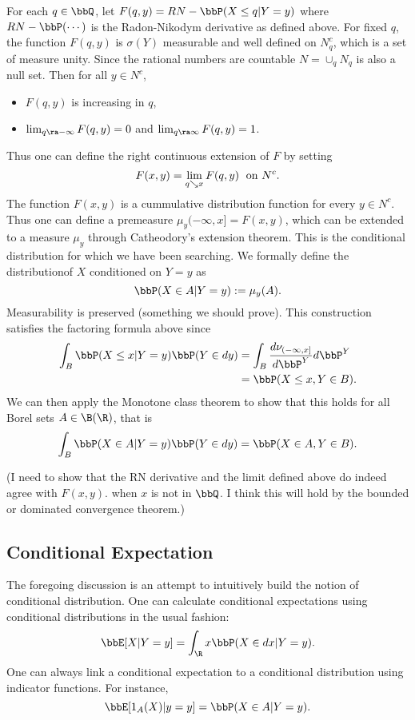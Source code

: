 \documentclass{report}
\begin{document}
For each $q \in \bbQ$, let $F(q,y) = RN-\bbP(X \leq q | Y = y)$ where $RN-\bbP(\cdots)$ is the Radon-Nikodym derivative as defined above.  For fixed $q$, the function $F(q,y)$ is $\sigma(Y)$ measurable and well defined on $N_q^c$, which is a set of measure unity.  Since the rational numbers are countable $N = \cup_q N_q$ is also a null set.  Then for all $y \in N^c$,
\begin{itemize}
\item $F(q,y)$ is increasing in $q$,
\item $\lim_{q \ra -\infty} F(q,y) = 0$ and $\lim_{q \ra \infty} F(q,y) = 1$.
\end{itemize}
Thus one can define the right continuous extension of $F$ by setting
\[
F(x,y) = \lim_{q \searrow x} F(q,y) \; \textmd{ on } N^c.
\]
The function $F(x,y)$ is a cummulative distribution function for every $y \in N^c$.  Thus one can define a premeasure $\mu_y(-\infty,x] = F(x,y)$, which can be extended to a measure $\mu_y$ through Catheodory's extension theorem.  This is the conditional distribution for which we have been searching.  We formally define the distributionof $X$ conditioned on $Y = y$ as
\[
\bbP(X \in A | Y = y) := \mu_y(A).
\]
Measurability is preserved (something we should prove).  This construction satisfies the factoring formula above since
\begin{align*}
\int_B \bbP(X \leq x | Y = y) \bbP(Y \in dy) 
& = \int_B \frac{d \nu_{(-\infty,x]}}{d \bbP^Y} d \bbP^{Y} \\
& = \bbP(X \leq x, Y \in B). 
\end{align*}
We can then apply the Monotone class theorem to show that this holds for all Borel sets $A \in \B(\R)$, that is
\[
\int_B \bbP(X \in A | Y = y) \bbP(Y \in dy) = \bbP(X \in A, Y \in B).
\]

(I need to show that the RN derivative and the limit defined above do indeed agree with $F(x,y)$. when $x$ is not in $\bbQ$.  I think this will hold by the bounded or dominated convergence theorem.)

\subsection{Conditional Expectation}

The foregoing discussion is an attempt to intuitively build the notion of conditional distribution.  One can calculate conditional expectations using conditional distributions in the usual fashion:
\[
\bbE[X | Y = y] = \int_\R x \bbP(X \in dx | Y = y).
\]
One can always link a conditional expectation to a conditional distribution using indicator functions.  For instance,
\[
\bbE[1_A(X) | y = y] = \bbP(X \in A | Y = y).
\]
\end{document}
